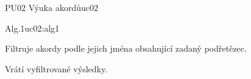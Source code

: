 \begin{usecase}{PU02 Výuka akordů}{uc02}
    \begin{scenario}{Alg.1}{uc02:alg1}
        \item Filtruje akordy podle jejich jména obsahující zadaný podřetězec.
        \item Vrátí vyfiltrované výsledky.
    \end{scenario}
\end{usecase}